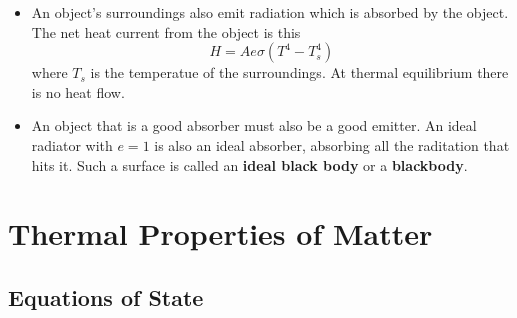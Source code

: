 \documentclass{article}
\begin{document}
\begin{itemize}
  \item An object's surroundings also emit radiation which is absorbed by the object. The net heat current from the object is this \[H = A e \sigma (T^4 - T_s^4)\] where $T_s$ is the temperatue of the surroundings. At thermal equilibrium there is no heat flow.

  \item An object that is a good absorber must also be a good emitter. An ideal radiator with $e = 1$ is also an ideal absorber, absorbing all the raditation that hits it. Such a surface is called an \textbf{ideal black body} or a \textbf{blackbody}.
\end{itemize}

\section{Thermal Properties of Matter}

\subsection{Equations of State}
\end{document}
